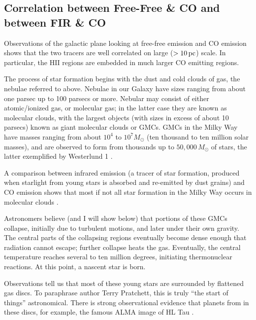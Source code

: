 \documentclass[../dissertation.tex]{subfiles}
\begin{document}

\subsection{Correlation between Free-Free \& CO and between FIR \& CO} \label{sec:Intro_FF_and_CO}

Observations of the galactic plane looking at free-free emission and CO emission shows that the two tracers are well correlated on large ($>10 \,\rm pc$) scale. In particular, the HII regions are embedded in much larger CO emitting regions. 

The process of star formation begins with the dust and cold clouds of gas, the nebulae referred to above. 
Nebulae in our Galaxy have sizes ranging from about one parsec up to 100 parsecs or more. 
Nebular may consist of either atomic/ionized gas, or molecular gas; 
in the latter case they are known as molecular clouds, with the largest objects (with sizes in excess of about 10 parsecs) known as giant molecular clouds or GMCs. 
GMCs in the Milky Way have masses ranging from about $10^4$ to $10^7M_\odot$ (ten thousand to ten million solar masses), 
and are observed to form from thousands up to $50,000\,M_\odot$ of stars, the latter exemplified by Westerlund 1 \citep{2017A&A...602A..22A}. 

A comparison between infrared emission (a tracer of star formation, produced when starlight from young stars is absorbed and re-emitted by dust grains) and CO emission shows that most if not all star formation in the Milky Way occurs in molecular clouds \citep{1989ApJ...339..149S}. 

Astronomers believe (and I will show below) that portions of these GMCs collapse, initially due to turbulent motions, and later under their own gravity. 
The central parts of the collapsing regions eventually become dense enough that radiation cannot escape; further collapse heats the gas. 
Eventually, the central temperature reaches several to ten million degrees, initiating  thermonuclear reactions. 
At this point, a nascent star is born.

Observations tell us that most of these young stars are surrounded by flattened gas discs. 
To paraphrase author Terry Pratchett, this is truly ``the start of things'' astronomical. 
There is strong observational evidence that planets from in these discs, for example, the famous ALMA image of HL Tau \citep{2015ApJ...808L...3A}.
\end{document}

